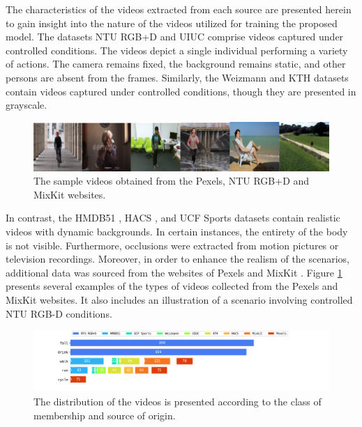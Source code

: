 \documentclass[mathematics,article,submit,pdftex,moreauthors]{Definitions/mdpi}
\begin{document}
The characteristics of the videos extracted from each source are presented herein to gain insight into the nature of the videos utilized for training the proposed model. The datasets NTU RGB+D \cite{8713892} and UIUC \cite{10100742} comprise videos captured under controlled conditions. The videos depict a single individual performing a variety of actions. The camera remains fixed, the background remains static, and other persons are absent from the frames. Similarly, the Weizmann \cite{ActionsAsSpaceTimeShapes_iccv05} and KTH \cite{1334462} datasets contain videos captured under controlled conditions, though they are presented in grayscale.

\begin{figure}[ht!]
\includegraphics[width=13.7cm]{Definitions/data3.png}
\caption{The sample videos obtained from the Pexels, NTU RGB+D and MixKit websites.} \label{fig:samples}
\end{figure}

In contrast, the HMDB51 \cite{6126543}, HACS \cite{zhao2019hacs}, and UCF Sports \cite{soomro2012ucf101} datasets contain realistic videos with dynamic backgrounds. In certain instances, the entirety of the body is not visible. Furthermore, occlusions were extracted from motion pictures or television recordings. Moreover, in order to enhance the realism of the scenarios, additional data was sourced from the websites of Pexels \cite{pexels} and MixKit \cite{mixkitMixkitAwesome}. Figure \ref{fig:samples} presents several examples of the types of videos collected from the Pexels and MixKit websites. It also includes an illustration of a scenario involving controlled NTU RGB-D conditions.
\begin{figure}[ht]
\centering

\includegraphics[width=16cm]{Definitions/dist_vid_class.png}

\caption{The distribution of the videos is presented according to the class of membership and source of origin.} \label{fig4}
\end{figure}
\end{document}
